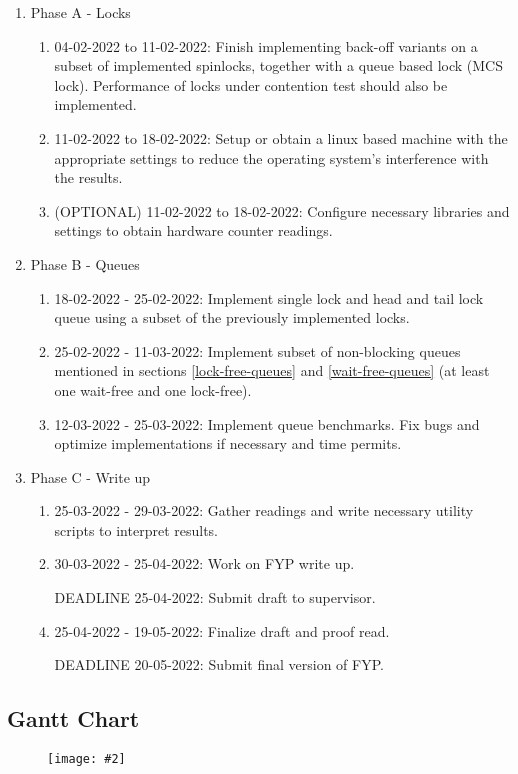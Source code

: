 \documentclass[a4paper, 12pt, titlepage]{article}
\newcommand{\image}[4]{
  \begin{figure}[H]
    \centerline{\texttt{[image: \#2]}}
    \captionof{figure}{#3}
    \label{fig: #4}
  \end{figure}
}
\begin{document}
\begin{singlespace}
\begin{enumerate}
  \item Phase A - Locks
  \begin{enumerate}
    \item 04-02-2022 to 11-02-2022: Finish implementing back-off variants on a subset of implemented spinlocks, together with a queue based lock (MCS lock). Performance of locks under contention test should also be implemented.
    \item 11-02-2022 to 18-02-2022: Setup or obtain a linux based machine with the appropriate settings to reduce the operating system's interference with the results.
  \item (OPTIONAL) 11-02-2022 to 18-02-2022: Configure necessary libraries and settings to obtain hardware counter readings.
  \end{enumerate}
  \item Phase B - Queues
  \begin{enumerate}
    \item 18-02-2022 - 25-02-2022: Implement single lock and head and tail lock queue using a subset of the previously implemented locks.
    \item 25-02-2022 - 11-03-2022: Implement subset of non-blocking queues mentioned in sections \ref{lock-free-queues} and \ref{wait-free-queues} (at least one wait-free and one lock-free).
    \item 12-03-2022 - 25-03-2022: Implement queue benchmarks. Fix bugs and optimize implementations if necessary and time permits.
  \end{enumerate}
  \item Phase C - Write up
  \begin{enumerate}
    \item 25-03-2022 - 29-03-2022: Gather readings and write necessary utility scripts to interpret results.
    \item 30-03-2022 - 25-04-2022: Work on FYP write up.
    \item [DEADLINE]25-04-2022: Submit draft to supervisor.
    \item 25-04-2022 - 19-05-2022: Finalize draft and proof read.
  \item [DEADLINE]20-05-2022: Submit final version of FYP.
  \end{enumerate}
\end{enumerate}

\subsection{Gantt Chart}
\image{0.8}{gantt_chart.png}{Gantt chart}{gantt}


\end{singlespace}
\end{document}
